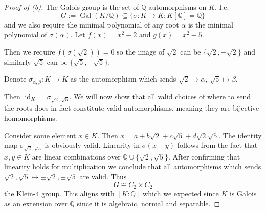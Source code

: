 \begin{proof}[Proof of (b)]
    The Galois group is the set of $\mathbb Q$-automorphisms 
    on $K$. I.e. 
    \[
        G:= \operatorname{Gal}(K/\mathbb Q) 
        \subseteq \{\sigma : K \to K : K[\mathbb Q] = \mathbb Q\}
    \]
    and we also require the minimal polynomial 
    of any root $\alpha$ is the minimal polynomial of 
    $\sigma(\alpha)$. 
    Let $f(x) = x^2 - 2$ and $g(x) = x^2 - 5$. 

    Then we require $f(\sigma(\sqrt 2)) = 0$ so the 
    image of $\sqrt 2$ can be $\{\sqrt 2, -\sqrt 2\}$ and 
    similarly $\sqrt 5$ can be $\{\sqrt 5, -\sqrt 5\}$. 

    Denote $\sigma_{\alpha, \beta} : K \to K$ as the automorphism 
    which sends $\sqrt 2 \mapsto \alpha$, $\sqrt 5 \mapsto \beta$. 

    Then $\operatorname{id}_K = \sigma_{\sqrt 2, \sqrt 5}$.
    We will now show that all valid choices of where 
    to send the roots does in fact constitute valid 
    automorphisms, meaning they are bijective homomorphisms. 
    
    Consider some element $x \in K$. Then $x = a + b\sqrt 2 + 
    c \sqrt 5 + d \sqrt2 \sqrt 5$. 
    The identity map $\sigma_{\sqrt 2, \sqrt 5}$ is obviously valid.
    Linearity in $\sigma(x+y)$ follows from the fact that 
    $x,y \in K$ are linear combinations over 
    $\mathbb Q\cup\{\sqrt 2, \sqrt 5\}$. 
    After confirming that linearity holds for 
    multiplication we conclude that 
    all automorphisms which sends $\sqrt 2, \sqrt 5 \mapsto 
    \pm \sqrt 2, \pm \sqrt 5$ are valid. Thus 
    \[
        G \cong C_2 \times C_2
    \]
    the Klein-$4$ group. This aligns with $[K : \mathbb Q]$ which 
    we expected since $K$ is Galois as an extension over 
    $\mathbb Q$ since it is algebraic, normal and separable. 
\end{proof}

